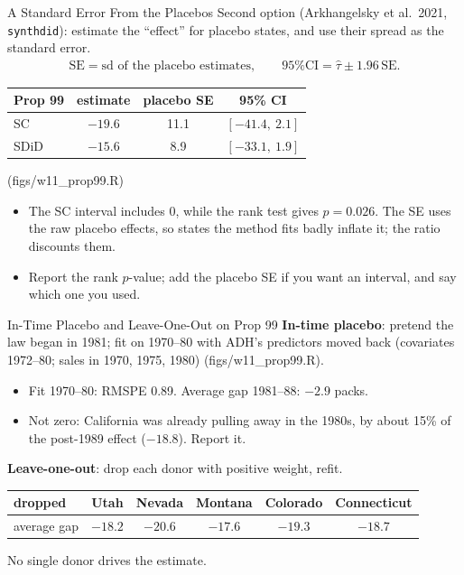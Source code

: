 \documentclass[aspectratio=169,11pt,xcolor=dvipsnames]{beamer}
\newcommand{\srcp}[1]{{\scriptsize\color{gray}(#1)}}
\begin{document}
\begin{frame}{A Standard Error From the Placebos}
Second option \srcp{Arkhangelsky et al.\ 2021, \texttt{synthdid}}: estimate the
``effect'' for placebo states, and use their spread as the standard error.
\begin{align*}
  \text{SE} = \text{sd of the placebo estimates}, \qquad
  \text{95\% CI} = \hat\tau \pm 1.96\,\text{SE} .
\end{align*}
\begin{center}\small
\renewcommand{\arraystretch}{1.1}
\begin{tabular}{@{}lccc@{}}
\toprule
Prop 99 & estimate & placebo SE & 95\% CI \\
\midrule
SC & $-19.6$ & 11.1 & $[-41.4,\ 2.1]$ \\
SDiD & $-15.6$ & 8.9 & $[-33.1,\ 1.9]$ \\
\bottomrule
\end{tabular}
\end{center}
{\footnotesize\srcp{figs/w11\_prop99.R}}
\begin{itemize}\itemsep2pt
  \item The SC interval includes 0, while the rank test gives $p = 0.026$. The
        SE uses the raw placebo effects, so states the method fits badly inflate
        it; the ratio discounts them.
  \item Report the rank $p$-value; add the placebo SE if you want an interval,
        and say which one you used.
\end{itemize}
\end{frame}

\begin{frame}{In-Time Placebo and Leave-One-Out on Prop 99}
\textbf{In-time placebo}: pretend the law began in 1981; fit on 1970--80 with
ADH's predictors moved back (covariates 1972--80; sales in 1970, 1975, 1980)
\srcp{figs/w11\_prop99.R}.
\begin{itemize}\itemsep1pt
  \item Fit 1970--80: RMSPE 0.89. Average gap 1981--88: $-2.9$ packs.
  \item Not zero: California was already pulling away in the 1980s, by about
        15\% of the post-1989 effect ($-18.8$). Report it.
\end{itemize}
\vskip4pt
\textbf{Leave-one-out}: drop each donor with positive weight, refit.
\begin{center}\small
\renewcommand{\arraystretch}{1.1}
\begin{tabular}{@{}lccccc@{}}
\toprule
dropped & Utah & Nevada & Montana & Colorado & Connecticut \\
\midrule
average gap & $-18.2$ & $-20.6$ & $-17.6$ & $-19.3$ & $-18.7$ \\
\bottomrule
\end{tabular}
\end{center}
\vskip2pt
No single donor drives the estimate.
\end{frame}
\end{document}
